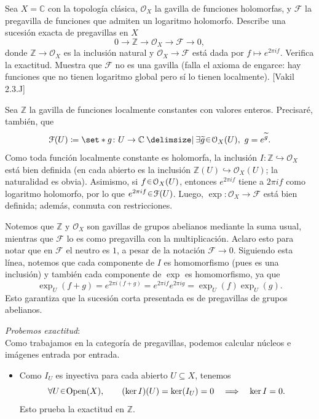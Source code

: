 \begin{ejer}\label{ejer:t3-sucesion-exponencial}
Sea $X=\mathbb C$ con la topología clásica, $\mathcal O_X$ la gavilla de funciones holomorfas, y $\mathcal F$ la pregavilla de funciones que admiten un logaritmo holomorfo. Describe una sucesión exacta de pregavillas en $X$
\[
0\longrightarrow\mathbb Z\longrightarrow\mathcal O_X\longrightarrow\mathcal F\longrightarrow0,
\]
donde $\mathbb Z\to\mathcal O_X$ es la inclusión natural y $\mathcal O_X\to\mathcal F$ está dada por $f\mapsto e^{2\pi i f}$. Verifica la exactitud. Muestra que $\mathcal F$ no es una gavilla (falla el axioma de engarce: hay funciones que no tienen logaritmo global pero sí lo tienen localmente). \hfill [Vakil 2.3.J]
\end{ejer}
\begin{sol}
Sea $\mathbb Z$ la gavilla de funciones localmente constantes con valores enteros. Precisaré, también, que
\[
\mathcal F(U)\coloneq\set*{g\colon U\to\mathbb C\given
\exists\widetilde g\en\mathcal O_X(U),\ g=e^{\widetilde g}}.
\]
Como toda función localmente constante es holomorfa, la inclusión $I\colon\mathbb Z\hookrightarrow\mathcal O_X$ está bien definida (en cada abierto es la inclusión $\mathbb Z(U)\hookrightarrow\mathcal O_X(U)$; la naturalidad es obvia). Asimismo, si $f\en\mathcal O_X(U)$, entonces $e^{2\pi i f}$ tiene a $2\pi i f$ como logaritmo holomorfo, por lo que $e^{2\pi i f}\en\mathcal F(U)$. Luego, $\exp\colon\mathcal O_X\to\mathcal F$ está bien definida; además, conmuta con restricciones.

Notemos que $\mathbb Z$ y $\mathcal O_X$ son gavillas de grupos abelianos mediante la suma usual, mientras que $\mathcal F$ lo es como pregavilla con la multiplicación. Aclaro esto para notar que en $\mathcal F$ el neutro es $1$, a pesar de la notación $\mathcal F\to0$. Siguiendo esta línea, notemos que cada componente de $I$ es homomorfismo (pues es una inclusión) y también cada componente de $\exp$ es homomorfismo, ya que
\[
\exp_U(f+g)=e^{2\pi i(f+g)}
=e^{2\pi i f}e^{2\pi i g}=\exp_U(f)\exp_U(g).
\]
Esto garantiza que la sucesión corta presentada es de pregavillas de grupos abelianos.

\medskip
\noindent\emph{Probemos exactitud}:\\
Como trabajamos en la categoría de pregavillas, podemos calcular núcleos e imágenes entrada por entrada.
\begin{itemize}
\item Como $I_U$ es inyectiva para cada abierto $U\subseteq X$, tenemos
\[
\forall U\en\Open(X),\qquad (\ker I)(U)=\ker(I_U)=0
\quad\Longrightarrow\quad\ker I=0.
\]
Esto prueba la exactitud en $\mathbb Z$.


\end{itemize}
\end{sol}
